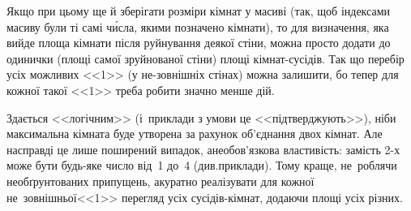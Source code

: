 Якщо при цьому ще й зберігати розміри кімнат у масиві (так, щоб індексами масиву були ті самі ч\'{и}сла, якими позначено кімнати), то для визначення, яка вийде площа кімнати після руйнування деякої стіни, можна просто додати до одинички (площі самої зруйнованої стіни) площі кімнат-сусідів. Так що перебір усіх можливих <<1>> (у не-зовнішніх стінах) можна залишити, бо тепер для кожної такої <<1>> треба робити значно менше дій.

Здається <<логічним>> (і~приклади з умови це <<підтверджують>>), ніби максимальна кімната буде утворена за рахунок об’єднання двох кімнат. Але насправді %
це лише поширений випадок, а\nolinebreak[3] не\nolinebreak[3] обов’язкова властивість: замість \mbox{2-х} може бути будь-яке число від~1 до~4 (див.\nolinebreak[2] приклади). Тому  краще, не~роблячи необґрунтованих припущень, акуратно реалізувати для кожної не~зовнішньої\nolinebreak[3] <<1>> перегляд усіх сусідів-кімнат, додаючи площі усіх різних.

\vspace{0.375\baselineskip}


\vspace{0.375\baselineskip}

